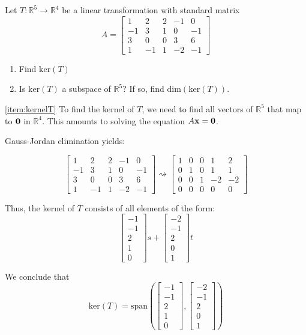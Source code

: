 \documentclass{ximera}
\renewcommand{\vec}[1]{{\bf #1}}
\newcommand{\RR}{\mathbb{R}}
\begin{document}
\begin{example}\label{ex:kernel} Let $T:\RR^5\rightarrow \RR^4$ be a linear transformation with standard matrix $$A=\begin{bmatrix}1 & 2 & 2 &-1 & 0\\-1 & 3 & 1 & 0 & -1\\3 & 0 & 0 & 3 & 6\\ 1 & -1 & 1 & -2 & -1\end{bmatrix}$$
\begin{enumerate}
\item \label{item:kernelT}
Find $\text{ker}(T)$
\item \label{item:dimkernelT}
Is $\text{ker}(T)$ a subspace of $\RR^5$?  If so, find $\text{dim}(\text{ker}(T))$.
\end{enumerate}
\begin{explanation}
\ref{item:kernelT} To find the kernel of $T$, we need to find all vectors of $\RR^5$ that map to $\vec{0}$ in $\RR^4$.  This amounts to solving the equation $A\vec{x}=\vec{0}$.

Gauss-Jordan elimination yields:

$$\begin{bmatrix}1 & 2 & 2 &-1 & 0\\-1 & 3 & 1 & 0 & -1\\3 & 0 & 0 & 3 & 6\\ 1 & -1 & 1 & -2 & -1\end{bmatrix}  \rightsquigarrow \begin{bmatrix} 1 & 0 & 0 & 1 & 2\\0 & 1 & 0 & 1 & 1\\0 & 0 & 1 & -2 & -2\\ 0 & 0 & 0 & 0 & 0 \end{bmatrix}$$

Thus, the kernel of $T$ consists of all elements of the form:
$$\begin{bmatrix}-1\\-1\\2\\1\\0\end{bmatrix}s+\begin{bmatrix}-2\\-1\\2\\0\\1\end{bmatrix}t$$

We conclude that 
$$\text{ker}(T)=\text{span}\left(\begin{bmatrix}-1\\-1\\2\\1\\0\end{bmatrix}, \begin{bmatrix}-2\\-1\\2\\0\\1\end{bmatrix}\right)$$


\end{explanation}
\end{example}
\end{document}
